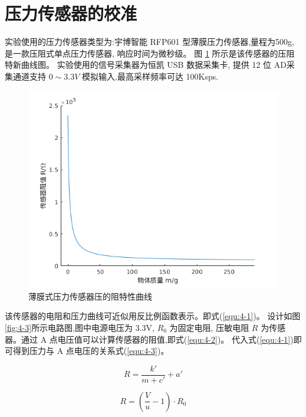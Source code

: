 \section{压力传感器的校准}
实验使用的压力传感器类型为:宇博智能 RFP601 型薄膜压力传感器,量程为500g,
是一款压阻式单点压力传感器, 响应时间为微秒级。
图 \ref{fig:4-2} 所示是该传感器的压阻特新曲线图。
实验使用的信号采集器为恒凯 USB 数据采集卡,
提供 12 位 AD采集通道支持 $0\sim 3.3V$ 模拟输入,最高采样频率可达 100Ksps.

\begin{figure}[!ht]
  \centering
  \includegraphics[width=12cm]{chapter04/pic/4-2}
  \caption{薄膜式压力传感器压的阻特性曲线}
  \label{fig:4-2}
  \vspace{-0.3cm}
\end{figure}

该传感器的电阻和压力曲线可近似用反比例函数表示。即式(\ref{equ:4-1})。
设计如图\ref{fig:4-3}所示电路图,图中电源电压为 3.3V, $R_0$ 为固定电阻,
压敏电阻 $R$ 为传感器。通过 A 点电压值可以计算传感器的阻值,即式(\ref{equ:4-2})。
代入式(\ref{equ:4-1})即可得到压力与 A 点电压的关系式(\ref{equ:4-3})。

\vspace{-10pt}
\begin{equation}
  \label{equ:4-1}
  R = \frac{{k'}}{{m + c'}} + a'
\end{equation}
\vspace{-30pt}

\begin{equation}
  \label{equ:4-2}
  R = (\frac{V}{u} - 1) \cdot {R_0}
\end{equation}
\vspace{-30pt}

